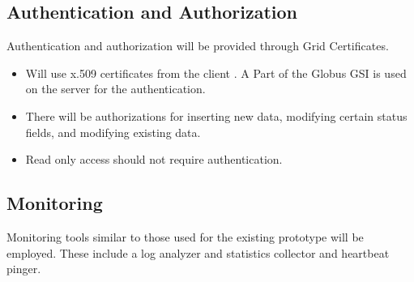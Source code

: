 \documentclass{cmspaper}
\begin{document}
   \subsection{Authentication and Authorization}
Authentication and authorization will be provided through Grid Certificates.
\begin{itemize}
      \item Will use x.509 certificates from the client . A Part of the Globus GSI is used on the server for the authentication.
      \item There will be authorizations for inserting new data, modifying certain status fields, and modifying existing data.
      \item Read only access should not require authentication.
\end{itemize}
   \subsection{Monitoring}
  Monitoring tools similar to those used for the existing prototype will be employed. These include a log analyzer and statistics collector and heartbeat pinger. 
\end{document}

